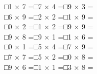 \documentclass[uplatex,
paper=a4,
fontsize=18pt,
jafontsize=16pt,
number_of_lines=30,
line_length=30zh,
baselineskip=25pt,
]{jlreq}
\begin{document}
□\hspace{1em}1 × 7 =\hspace{3em}□\hspace{1em}7 × 4 =\hspace{3em}□\hspace{1em}9 × 3 =\hspace{3em}
\\

□\hspace{1em}6 × 9 =\hspace{3em}□\hspace{1em}2 × 2 =\hspace{3em}□\hspace{1em}1 × 9 =\hspace{3em}
\\

□\hspace{1em}0 × 2 =\hspace{3em}□\hspace{1em}1 × 2 =\hspace{3em}□\hspace{1em}9 × 9 =\hspace{3em}
\\

□\hspace{1em}9 × 8 =\hspace{3em}□\hspace{1em}9 × 1 =\hspace{3em}□\hspace{1em}1 × 6 =\hspace{3em}
\\

□\hspace{1em}0 × 1 =\hspace{3em}□\hspace{1em}5 × 4 =\hspace{3em}□\hspace{1em}7 × 9 =\hspace{3em}
\\

□\hspace{1em}7 × 7 =\hspace{3em}□\hspace{1em}5 × 2 =\hspace{3em}□\hspace{1em}0 × 8 =\hspace{3em}
\\

□\hspace{1em}9 × 6 =\hspace{3em}□\hspace{1em}1 × 1 =\hspace{3em}□\hspace{1em}3 × 8 =\hspace{3em}
\\
\end{document}
